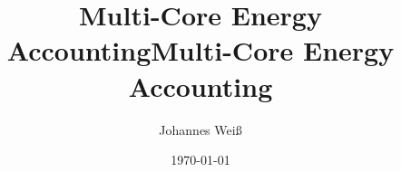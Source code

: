 \documentclass[a4paper]{scrreprt}
\title{Multi-Core Energy Accounting}
\begin{document}
\pagestyle{empty}

\title{Multi-Core Energy Accounting}
\author{Johannes Weiß\\
        }
\date{\today}
\maketitle
\thispagestyle{empty}
\pagestyle{empty}

\maketitle

\tableofcontents

\begin{abstract}
\end{abstract}













\end{document}
